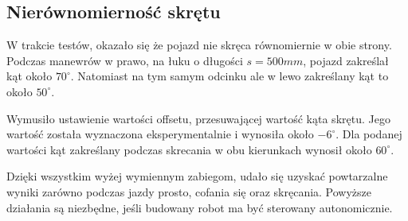        \subsection{Nierównomierność skrętu}
        \label{subsec:nierownomiernosc_skretu}
            W trakcie testów, okazało się że pojazd nie skręca równomiernie w obie strony.
%
            Podczas manewrów w prawo, na łuku o długości $s = 500mm$, pojazd zakreślał kąt około $70^\circ$.
            Natomiast na tym samym odcinku ale w lewo zakreślany kąt to około $50^\circ$.

            Wymusiło ustawienie wartości offsetu, przesuwającej wartość kąta skrętu.
            Jego wartość została wyznaczona eksperymentalnie i wynosiła około $-6^\circ$.
            Dla podanej wartości kąt zakreślany podczas skrecania w obu kierunkach wynosił około $60^\circ$.



    Dzięki wszystkim wyżej wymiennym zabiegom, udało się uzyskać powtarzalne wyniki zarówno podczas jazdy prosto, cofania się oraz skręcania.
    Powyższe działania są niezbędne, jeśli budowany robot ma być sterowany autonomicznie.

